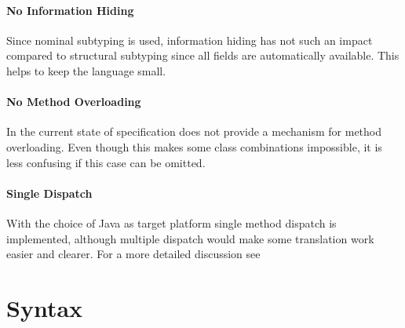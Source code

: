 \paragraph{No Information Hiding}
Since nominal subtyping is used, information hiding has not such an impact
compared to structural subtyping since all fields are automatically
available. This helps to keep the language small.

\paragraph{No Method Overloading}
In the current state of specification \ooplss does not provide a mechanism
for method overloading. Even though this makes some class combinations impossible,
it is less confusing if this case can be omitted.

\paragraph{Single Dispatch}
With the choice of Java as target platform single method dispatch is
implemented, although multiple dispatch would make some translation work
easier and clearer. For a more detailed discussion see 

\section{Syntax}
